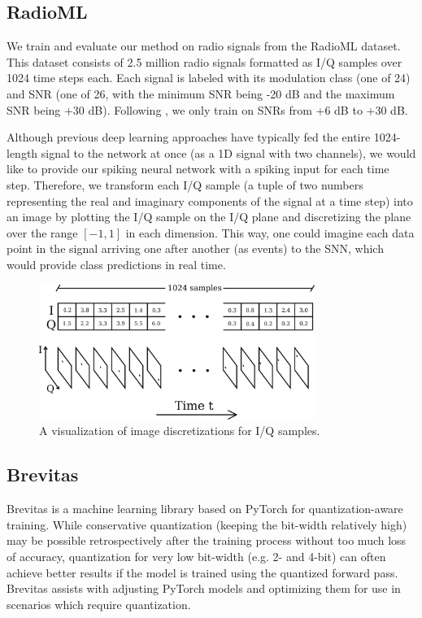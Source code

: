 \documentclass[parskip=true, 10pt]{scrartcl}
\begin{document}
\subsection{RadioML}

We train and evaluate our method on radio signals from the RadioML dataset. This dataset consists of 2.5 million radio signals formatted as I/Q samples over 1024 time steps each. Each signal is labeled with its modulation class (one of 24) and SNR (one of 26, with the minimum SNR being -20 dB and the maximum SNR being +30 dB). Following \cite{previouswork}, we only train on SNRs from +6 dB to +30 dB.

Although previous deep learning approaches have typically fed the entire 1024-length signal to the network at once (as a 1D signal with two channels), we would like to provide our spiking neural network with a spiking input for each time step. Therefore, we transform each I/Q sample (a tuple of two numbers representing the real and imaginary components of the signal at a time step) into an image by plotting the I/Q sample on the I/Q plane and discretizing the plane over the range $[-1, 1]$ in each dimension. This way, one could imagine each data point in the signal arriving one after another (as events) to the SNN, which would provide class predictions in real time.

\begin{figure}[H]
    \centering
    \includegraphics[width=0.8\textwidth]{radioml.png}
    \caption{A visualization of image discretizations for I/Q samples.}
    \label{fig:radioml_iq_images}
\end{figure}

\subsection{Brevitas}
\label{sec:brevitas}

Brevitas is a machine learning library based on PyTorch for quantization-aware training. While conservative quantization (keeping the bit-width relatively high) may be possible retrospectively after the training process without too much loss of accuracy, quantization for very low bit-width (e.g. 2- and 4-bit) can often achieve better results
if the  model is trained using the quantized forward pass. Brevitas assists with adjusting PyTorch models and optimizing them for use in scenarios which require quantization.
\end{document}
